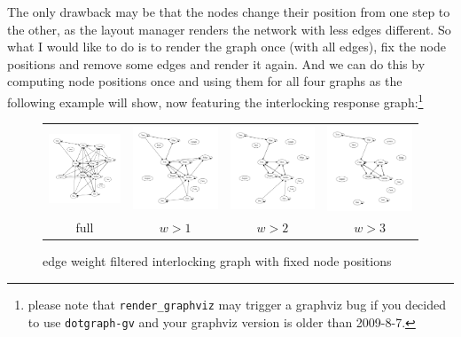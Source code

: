 \documentclass[a4paper]{scrartcl}
\newcommand{\file}[1]{\texttt{\color{file}#1}}
\newcommand{\cmd}[1]{\texttt{\color{cmd}#1}}
\begin{document}
The only drawback may be that the nodes change their position from one
step to the other, as the layout manager renders the network with less
edges different. So what I would like to do is to render the graph
once (with all edges), fix the node positions and remove some edges
and render it again. And we can do this by computing node positions
once and using them for all four graphs as the following example will
show, now featuring the interlocking response graph:\footnote{please
  note that \cmd{render\_graphviz} may trigger a graphviz bug if you
  decided to use \file{dotgraph-gv} and your graphviz version is older
than 2009-8-7.}

\begin{figure}
  \centering
  
  \begin{tabular}{@{}c@{}c@{}c@{}c@{}}
    \includegraphics[width=.25\linewidth]{gv_il0} &
    \includegraphics[width=.25\linewidth]{gv_il1} &
    \includegraphics[width=.25\linewidth]{gv_il2} & 
    \includegraphics[width=.25\linewidth]{gv_il3}\\
    full & $w>1$ & $w>2$ & $w>3$
  \end{tabular}
  \caption{edge weight filtered interlocking graph with fixed node positions}
  \label{fig:il-weightfilter}
\end{figure}
\end{document}
